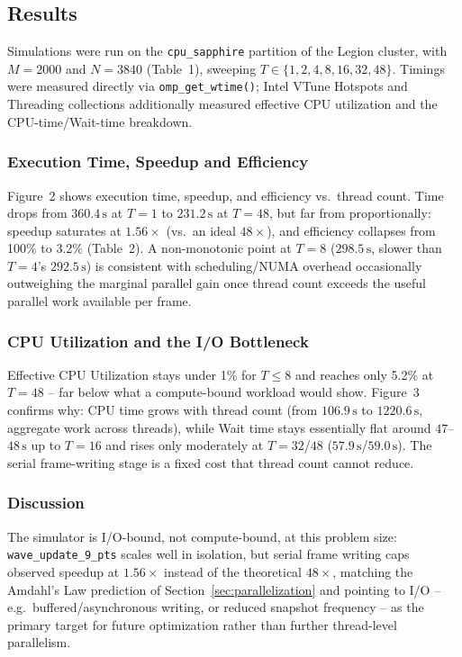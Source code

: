 \subsection{Results}
\label{sec:results}
Simulations were run on the \texttt{cpu\_sapphire} partition of the
Legion cluster, with $M=2000$ and $N=3840$ (Table~1), sweeping
$T \in \{1,2,4,8,16,32,48\}$. Timings were measured directly via
\texttt{omp\_get\_wtime()}; Intel VTune Hotspots and Threading
collections additionally measured effective CPU utilization and the
CPU-time/Wait-time breakdown.

\subsubsection{Execution Time, Speedup and Efficiency}
Figure~2 shows execution time, speedup, and efficiency vs.\ thread
count. Time drops from $360.4\,\mathrm{s}$ at $T=1$ to
$231.2\,\mathrm{s}$ at $T=48$, but far from proportionally: speedup
saturates at $1.56\times$ (vs.\ an ideal $48\times$), and efficiency
collapses from 100\% to 3.2\% (Table~2). A non-monotonic point at
$T=8$ ($298.5\,\mathrm{s}$, slower than $T=4$'s $292.5\,\mathrm{s}$)
is consistent with scheduling/NUMA overhead occasionally outweighing
the marginal parallel gain once thread count exceeds the useful
parallel work available per frame.

\subsubsection{CPU Utilization and the I/O Bottleneck}
Effective CPU Utilization stays under 1\% for $T\le 8$ and reaches
only 5.2\% at $T=48$ -- far below what a compute-bound workload
would show. Figure~3 confirms why: CPU time grows with thread count
(from $106.9\,\mathrm{s}$ to $1220.6\,\mathrm{s}$, aggregate work
across threads), while Wait time stays essentially flat around
$47$--$48\,\mathrm{s}$ up to $T=16$ and rises only moderately at
$T=32$/$48$ ($57.9\,\mathrm{s}$/$59.0\,\mathrm{s}$). The serial
frame-writing stage is a fixed cost that thread count cannot reduce.

\subsubsection{Discussion}
The simulator is I/O-bound, not compute-bound, at this problem size:
\texttt{wave\_update\_9\_pts} scales well in isolation, but serial
frame writing caps observed speedup at $1.56\times$ instead of the
theoretical $48\times$, matching the Amdahl's Law prediction of
Section~\ref{sec:parallelization} and pointing to I/O -- e.g.\
buffered/asynchronous writing, or reduced snapshot frequency -- as
the primary target for future optimization rather than further
thread-level parallelism.

